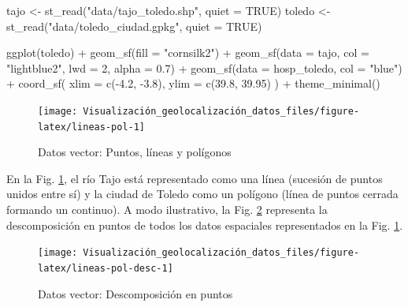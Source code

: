 \documentclass[
]{book}
\newenvironment{Shaded}{\begin{snugshade}}{\end{snugshade}}
\newcommand{\AttributeTok}[1]{\textcolor[rgb]{0.77,0.63,0.00}{#1}}
\newcommand{\ConstantTok}[1]{\textcolor[rgb]{0.00,0.00,0.00}{#1}}
\newcommand{\DecValTok}[1]{\textcolor[rgb]{0.00,0.00,0.81}{#1}}
\newcommand{\FloatTok}[1]{\textcolor[rgb]{0.00,0.00,0.81}{#1}}
\newcommand{\FunctionTok}[1]{\textcolor[rgb]{0.00,0.00,0.00}{#1}}
\newcommand{\NormalTok}[1]{#1}
\newcommand{\OtherTok}[1]{\textcolor[rgb]{0.56,0.35,0.01}{#1}}
\newcommand{\SpecialCharTok}[1]{\textcolor[rgb]{0.00,0.00,0.00}{#1}}
\newcommand{\StringTok}[1]{\textcolor[rgb]{0.31,0.60,0.02}{#1}}
\theoremstyle{definition}
\theoremstyle{definition}
\theoremstyle{definition}
\theoremstyle{definition}
\theoremstyle{remark}
\begin{document}
\begin{Shaded}
\begin{Highlighting}[]

\NormalTok{tajo }\OtherTok{\textless{}{-}} \FunctionTok{st\_read}\NormalTok{(}\StringTok{"data/tajo\_toledo.shp"}\NormalTok{, }\AttributeTok{quiet =} \ConstantTok{TRUE}\NormalTok{)}
\NormalTok{toledo }\OtherTok{\textless{}{-}} \FunctionTok{st\_read}\NormalTok{(}\StringTok{"data/toledo\_ciudad.gpkg"}\NormalTok{, }\AttributeTok{quiet =} \ConstantTok{TRUE}\NormalTok{)}


\FunctionTok{ggplot}\NormalTok{(toledo) }\SpecialCharTok{+}
  \FunctionTok{geom\_sf}\NormalTok{(}\AttributeTok{fill =} \StringTok{"cornsilk2"}\NormalTok{) }\SpecialCharTok{+}
  \FunctionTok{geom\_sf}\NormalTok{(}\AttributeTok{data =}\NormalTok{ tajo, }\AttributeTok{col =} \StringTok{"lightblue2"}\NormalTok{, }\AttributeTok{lwd =} \DecValTok{2}\NormalTok{, }\AttributeTok{alpha =} \FloatTok{0.7}\NormalTok{) }\SpecialCharTok{+}
  \FunctionTok{geom\_sf}\NormalTok{(}\AttributeTok{data =}\NormalTok{ hosp\_toledo, }\AttributeTok{col =} \StringTok{"blue"}\NormalTok{) }\SpecialCharTok{+}
  \FunctionTok{coord\_sf}\NormalTok{(}
    \AttributeTok{xlim =} \FunctionTok{c}\NormalTok{(}\SpecialCharTok{{-}}\FloatTok{4.2}\NormalTok{, }\SpecialCharTok{{-}}\FloatTok{3.8}\NormalTok{),}
    \AttributeTok{ylim =} \FunctionTok{c}\NormalTok{(}\FloatTok{39.8}\NormalTok{, }\FloatTok{39.95}\NormalTok{)}
\NormalTok{  ) }\SpecialCharTok{+}
  \FunctionTok{theme\_minimal}\NormalTok{()}
\end{Highlighting}
\end{Shaded}

\begin{figure}

{\centering \texttt{[image: Visualización\_geolocalización\_datos\_files/figure-latex/lineas-pol-1]} 

}

\caption{Datos vector: Puntos, líneas y polígonos}\label{fig:lineas-pol}
\end{figure}

En la Fig. \ref{fig:lineas-pol}, el río Tajo está representado como una línea
(sucesión de puntos unidos entre sí) y la ciudad de Toledo como un polígono
(línea de puntos cerrada formando un continuo). A modo ilustrativo, la Fig.
\ref{fig:lineas-pol-desc} representa la descomposición en puntos de todos los
datos espaciales representados en la Fig. \ref{fig:lineas-pol}.

\begin{figure}

{\centering \texttt{[image: Visualización\_geolocalización\_datos\_files/figure-latex/lineas-pol-desc-1]} 

}

\caption{Datos vector: Descomposición en puntos}\label{fig:lineas-pol-desc}
\end{figure}
\end{document}
